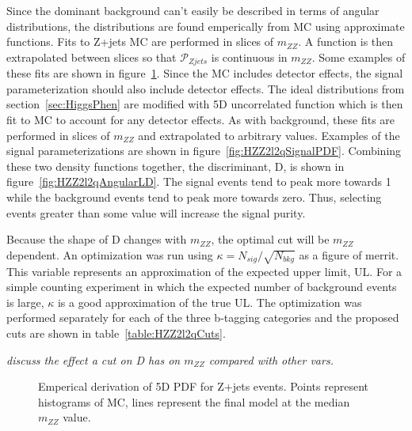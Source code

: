 Since the dominant background can't easily be described in 
terms of angular distributions, the distributions are found 
emperically from MC using approximate functions.  Fits to 
Z+jets MC are performed in slices of $m_{ZZ}$.  A function
is then extrapolated between slices so that $\mathscr{P}_{Zjets}$ 
is continuous in $m_{ZZ}$.  Some examples of these fits are shown
in figure~\ref{fig:HZZ2l2qBackgroundPDF}.  Since the MC includes 
detector effects, 
the signal parameterization should also include detector effects.
The ideal distributions from section~\ref{sec:HiggsPhen} are 
modified with 5D uncorrelated function which is then fit to 
MC to account for any detector effects.  As with background, 
these fits are performed in slices of $m_{ZZ}$ and extrapolated
to arbitrary values.  Examples of the signal parameterizations
are shown in figure~\ref{fig:HZZ2l2qSignalPDF}.  Combining these 
two density
functions together, the discriminant, D, is shown in
figure~\ref{fig:HZZ2l2qAngularLD}.  The signal events tend to peak more 
towards 1 while the background events tend to peak more towards
zero.  Thus, selecting events greater than some value will
increase the signal purity.  

Because the shape of D changes with $m_{ZZ}$, the optimal cut will 
be $m_{ZZ}$ dependent.
An optimization was run using $\kappa=N_{sig}/\sqrt{N_{bkg}}$ as a figure of 
merrit.  This variable represents an approximation of the expected 
upper limit, UL.  For a simple counting experiment in which the 
expected number of background events is large, $\kappa$ is a good
approximation of the true UL.  The optimization was performed 
separately for each of the three b-tagging categories and the
proposed cuts are shown in table~\ref{table:HZZ2l2qCuts}.

{\it discuss the effect a cut on D has on $m_{ZZ}$ compared with other vars.}

\begin{figure}
\begin{center}
\label{fig:HZZ2l2qBackgroundPDF}
\caption{ Emperical derivation of 5D PDF for Z+jets events.  Points
represent histograms of MC, lines represent the final model at the 
median $m_{ZZ}$ value.}
\end{center}
\end{figure}

